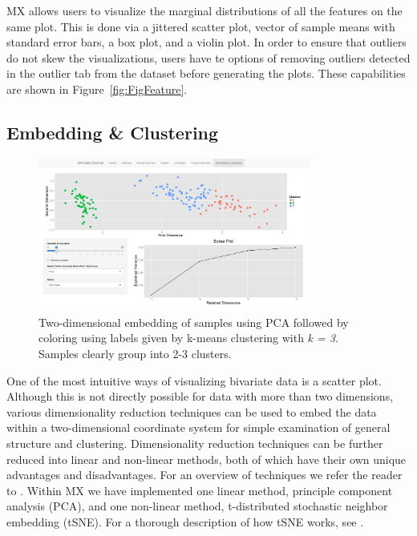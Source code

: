 \documentclass[12pt]{article}
\begin{document}
MX allows users to visualize the marginal distributions of all the features on the same plot. This is done via a jittered scatter plot, vector of sample means with standard error bars, a box plot, and a violin plot. In order to ensure that outliers do not skew the visualizations, users have te options of removing outliers detected in the outlier tab from the dataset before generating the plots. These capabilities are shown in  Figure~\ref{fig:FigFeature}.

\subsection{Embedding \& Clustering}
\label{subsec:SubSecEmbedding}

\begin{figure}[t!]
	\centering
	\includegraphics[width=0.8\textwidth]{Figures/Iris/Embed_Raw.png}
	\caption{Two-dimensional embedding of samples using PCA followed by coloring using labels given by k-means clustering with \textit{k = 3}. Samples clearly group into 2-3 clusters.}
	\label{fig:FigEmbedding}
\end{figure}

One of the most intuitive ways of visualizing bivariate data is a scatter plot. Although this is not directly possible for data with more than two dimensions, various dimensionality reduction techniques can be used to embed the data within a two-dimensional coordinate system for simple examination of general structure and clustering. Dimensionality reduction techniques can be further reduced into linear and non-linear methods, both of which have their own unique advantages and disadvantages. For an overview of techniques we refer the reader to \cite{van2009dimensionality}. Within MX we have implemented one linear method, principle component analysis (PCA), and one non-linear method, t-distributed stochastic neighbor embedding (tSNE). For a thorough description of how tSNE works, see \cite{van2008visualizing}.
\end{document}
